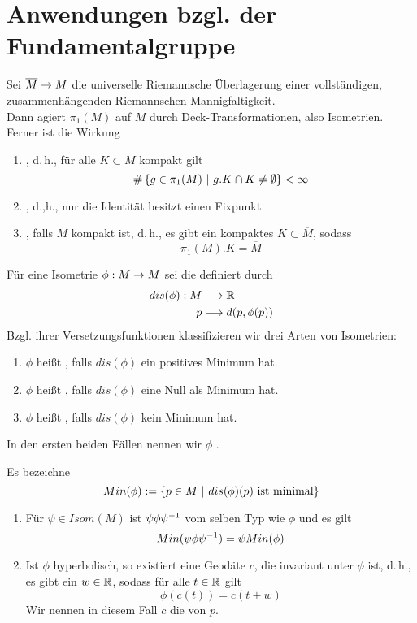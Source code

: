 \documentclass{book}
\renewcommand{\l}[1]{\overline{#1}}
\begin{document}
\newpage
\section{Anwendungen bzgl. der Fundamentalgruppe}
\Bem{}
Sei $\l M \pfeil{} M$ die universelle Riemannsche Überlagerung einer vollständigen, zusammenhängenden Riemannschen Mannigfaltigkeit.\\
Dann agiert $\pi_1(M)$ auf $M$ durch Deck-Transformationen, also Isometrien. Ferner ist die Wirkung
\begin{enumerate}[1.)]
\item {}, d.\,h., für alle $K \subset M$ kompakt gilt
\[ \#\set{g \in \pi_1(M)}{g.K \cap K \neq \emptyset} < \infty \]
\item {}, d.,h., nur die Identität besitzt einen Fixpunkt
\item {}, falls $M$ kompakt ist, d.\,h., es gibt ein kompaktes $K \subset \l M$, sodass
\[ \pi_1(M).K = \l M \] 
\end{enumerate}

\Def{}
Für eine Isometrie $\phi : M \overset{}{\rightarrow} M$ sei die  definiert durch
\begin{align*}
dis(\phi) : M & \overset{}{\longrightarrow} \mathbb{R}\\
p & \longmapsto d(p, \phi(p))
\end{align*}
Bzgl. ihrer Versetzungsfunktionen klassifizieren wir drei Arten von Isometrien:
\begin{enumerate}[1.)]
\item $\phi$ heißt , falls $dis(\phi)$ ein positives Minimum hat.
\item $\phi$ heißt , falls $dis(\phi)$ eine Null als Minimum hat.
\item $\phi$ heißt , falls $dis(\phi)$ kein Minimum hat.
\end{enumerate}
In den ersten beiden Fällen nennen wir $\phi$ .

\Bem{}
Es bezeichne
\[ Min(\phi) := \set{p \in M}{dis(\phi)(p) \text{ ist minimal}} \]
\begin{enumerate}[1.)]
\item Für $\psi \in Isom(M)$ ist $\psi \phi \psi ^{-1}$ vom selben Typ wie $\phi$ und es gilt
\[ Min(\psi \phi \psi^{-1}) = \psi Min(\phi) \]
\item Ist $\phi$ hyperbolisch, so existiert eine Geodäte $c$, die invariant unter $\phi$ ist, d.\,h., es gibt ein $w \in \mathbb{R}$, sodass für alle $t \in \mathbb{R}$ gilt
\[ \phi(c(t)) = c(t+w) \]
Wir nennen in diesem Fall $c$ die  von $p$.
\end{enumerate}
\end{document}
